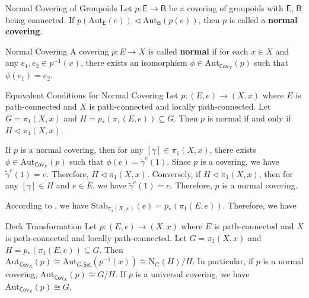 \documentclass{report}
\begin{document}
\begin{definition}{Normal Covering of Groupoids}{}
	Let $p:\mathsf{E}\to \mathsf{B}$ be a covering of groupoids with $\mathsf{E}$, $\mathsf{B}$ being connected. If $p(\mathrm{Aut}_{\mathsf{E}}(e))\lhd \mathrm{Aut}_{\mathsf{B}}(p(e))$, then $p$ is called a \textbf{normal covering}.
\end{definition}



\begin{definition}{Normal Covering}{}
	A covering $p: E \rightarrow X$ is called \textbf{normal} if for each $x \in X$ and any $e_1,e_2\in p^{-1}(x)$, there exists an isomorphism $\phi\in \mathrm{Aut}_{\mathsf{Cov}_X}(p)$ such that $\phi(e_1)=e_2$.
\end{definition}

\begin{proposition}{Equivalent Conditions for Normal Covering}{}
	Let $p:\left(E, e\right) \rightarrow\left(X, x\right)$ where $E$ is path-connected and $X$ is path-connected and locally path-connected. Let $G=\pi_1\left(X, x\right)$ and $H=p_*\left(\pi_1\left(E,e\right)\right) \subseteq G$. Then $p$ is normal if and only if $H\lhd\pi_1\left(X, x\right)$.
\end{proposition}

\begin{prf}
	If $p$ is a normal covering, then for any $[\gamma]\in \pi_1\left(X, x\right)$, there exists $\phi\in \mathrm{Aut}_{\mathsf{Cov}_X}(p)$ such that $\phi(e)=\widetilde{\gamma}^e(1)$. Since $p$ is a covering, we have $\widetilde{\gamma}^e(1)=e$. Therefore, $H\lhd\pi_1\left(X, x\right)$. Conversely, if $H\lhd\pi_1\left(X, x\right)$, then for any $[\gamma]\in H$ and $e\in E$, we have $\widetilde{\gamma}^e(1)=e$. Therefore, $p$ is a normal covering.


	According to , we have $\mathrm{Stab}_{\pi_1(X, x)}(e)=p_*(\pi_1(E, e))$. Therefore, we have

\end{prf}
\begin{proposition}{Deck Transformation}{}
	Let $p:\left(E, e\right) \rightarrow\left(X, x\right)$ where $E$ is path-connected and $X$ is path-connected and locally path-connected. Let $G=\pi_1\left(X, x\right)$ and $H=p_*\left(\pi_1\left(E,e\right)\right) \subseteq G$. Then $\mathrm{Aut}_{\mathsf{Cov}_X}(p)\cong\mathrm{Aut}_{G\text{-}\mathsf{Set}}(p^{-1}(x))\cong\mathrm{N}_{G}(H) / H$.
	In particular, if $p$ is a normal covering, $\mathrm{Aut}_{\mathsf{Cov}_X}(p)\cong G / H$. If $p$ is a universal covering, we have $\mathrm{Aut}_{\mathsf{Cov}_X}(p) \cong G$.
\end{proposition}
\end{document}
